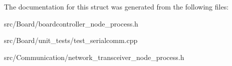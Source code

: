 The documentation for this struct was generated from the following files\+:\begin{DoxyCompactItemize}
\item 
src/\+Board/boardcontroller\+\_\+node\+\_\+process.\+h\item 
src/\+Board/unit\+\_\+tests/test\+\_\+serialcomm.\+cpp\item 
src/\+Communication/network\+\_\+transceiver\+\_\+node\+\_\+process.\+h\end{DoxyCompactItemize}
